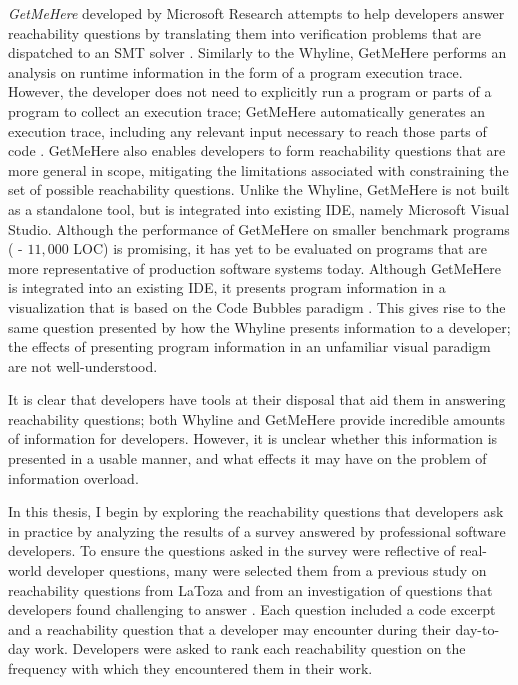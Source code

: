 \emph{GetMeHere} developed by Microsoft Research attempts to help developers 
answer reachability questions by translating them into verification problems
that are dispatched to an \ac{SMT} solver \cite{barnett-2014-get}.
Similarly to the Whyline, GetMeHere performs an analysis on runtime information
in the form of a program execution trace.
However, the developer does not need to explicitly run a program or parts of a 
program to collect an execution trace; GetMeHere automatically generates an 
execution trace, including any relevant input necessary to reach those parts of 
code \cite{barnett-2014-get}.
GetMeHere also enables developers to form reachability questions that are more
general in scope, mitigating the limitations associated with constraining
the set of possible reachability questions.
Unlike the Whyline, GetMeHere is not built as a standalone tool, but is
integrated into existing \ac{IDE}, namely Microsoft Visual Studio.
Although the performance of GetMeHere on smaller benchmark programs ( - $11,000$ LOC) is promising, it has yet to be evaluated on programs that 
are more representative of production software systems today.
Although GetMeHere is integrated into an existing \ac{IDE}, it presents program
information in a visualization that is based on the Code Bubbles paradigm
\cite{barnett-2014-get, bragdon-2010-code-bubbles}.
This gives rise to the same question presented by how the Whyline presents
information to a developer; the effects of presenting program information in
an unfamiliar visual paradigm are not well-understood.

\par It is clear that developers have tools at their disposal that aid them in
answering reachability questions; both Whyline and GetMeHere provide incredible 
amounts of information for developers.
However, it is unclear whether this information is presented in a usable
manner, and what effects it may have on the problem of information overload.

\par In this thesis, I begin by exploring the reachability questions that
developers ask in practice by analyzing the results of a survey answered
by \numparticipants{} professional software developers.
To ensure the questions asked in the survey were reflective of real-world
developer questions, many were selected them from a previous study on 
reachability questions from LaToza \etal{} \cite{latoza-2010-reach} and from an
investigation of questions that developers found challenging to answer
\cite{latoza-2010-hard-questions}.
Each question included a code excerpt and a reachability question that a
developer may encounter during their day-to-day work.
Developers were asked to rank each reachability question on the frequency with 
which they encountered them in their work.

